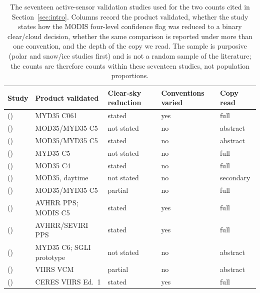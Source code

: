 \begin{table}[!htbp]
\centering
\caption{The seventeen active-sensor validation studies used for the two counts cited in Section~\ref{sec:intro}. Columns record the product validated, whether the study states how the MODIS four-level confidence flag was reduced to a binary clear/cloud decision, whether the same comparison is reported under more than one convention, and the depth of the copy we read. The sample is purposive (polar and snow/ice studies first) and is not a random sample of the literature; the counts are therefore counts within these seventeen studies, not population proportions.}
\label{tab:literature}
\scriptsize
\begin{tabular}{@{}>{\raggedright\arraybackslash}p{3.4cm}>{\raggedright\arraybackslash}p{4.6cm}>{\raggedright\arraybackslash}p{1.9cm}>{\raggedright\arraybackslash}p{1.6cm}>{\raggedright\arraybackslash}p{1.5cm}@{}}
\toprule
Study & Product validated & Clear-sky reduction & Conventions varied & Copy read \\
\midrule
\citeauthor{kotarba2020} (\citeyear{kotarba2020}) & MYD35 C061 & stated & yes & full \\
\citeauthor{holz2008} (\citeyear{holz2008}) & MOD35/MYD35 C5 & not stated & no & abstract \\
\citeauthor{chan2013} (\citeyear{chan2013}) & MOD35/MYD35 C5 & stated & no & abstract \\
\citeauthor{liu2010} (\citeyear{liu2010}) & MYD35 C5 & not stated & no & full \\
\citeauthor{liu2004} (\citeyear{liu2004}) & MOD35 C4 & stated & no & full \\
\citeauthor{berendes2004} (\citeyear{berendes2004}) & MOD35, daytime & not stated & no & secondary \\
\citeauthor{ackerman2008} (\citeyear{ackerman2008}) & MOD35/MYD35 C5 & partial & no & full \\
\citeauthor{karlsson2010} (\citeyear{karlsson2010}) & AVHRR PPS; MODIS C5 & stated & yes & full \\
\citeauthor{karlsson2020} (\citeyear{karlsson2020}) & AVHRR/SEVIRI PPS & stated & yes & full \\
\citeauthor{chen2014} (\citeyear{chen2014}) & MYD35 C6; SGLI prototype & not stated & no & abstract \\
\citeauthor{kopp2014} (\citeyear{kopp2014}) & VIIRS VCM & partial & no & abstract \\
\citeauthor{yost2023} (\citeyear{yost2023}) & CERES VIIRS Ed.~1 & stated & yes & full \\

\end{tabular}
\end{table}

